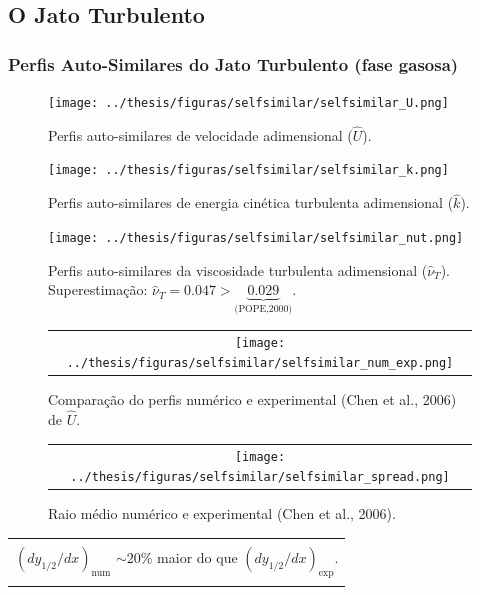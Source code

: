 \documentclass[bars,mathserif]{beamer}
\begin{document}
\subsection{O Jato Turbulento}
\frametitle{Perfis Auto-Similares do Jato Turbulento (fase gasosa)}
\begin{frame}
\begin{overprint}
\begin{figure}
\centering
\texttt{[image: ../thesis/figuras/selfsimilar/selfsimilar\_U.png]}
\caption{Perfis auto-similares de velocidade adimensional ($\hat{U}$).}
\end{figure}

\begin{figure}
\centering
\texttt{[image: ../thesis/figuras/selfsimilar/selfsimilar\_k.png]}
\caption{Perfis auto-similares de energia cinética turbulenta adimensional ($\hat{k}$).}
\end{figure}

\begin{figure}
\centering
\texttt{[image: ../thesis/figuras/selfsimilar/selfsimilar\_nut.png]}
\caption{Perfis auto-similares da viscosidade turbulenta adimensional ($\hat{\nu}_T$). Superestimação: $\hat{\nu}_T=0.047 > \underbrace{0.029}_{\text{(POPE,2000)}}$.}
\end{figure}
\end{overprint}
\end{frame}
%
\begin{frame}
 \begin{figure}[!htb]
 \centering
\begin{tabular}{c}
 \texttt{[image: ../thesis/figuras/selfsimilar/selfsimilar\_num\_exp.png]}
\end{tabular}
 \caption{Comparação do perfis numérico e experimental (Chen et al., 2006) de $\hat{U}$.}
\end{figure}
\end{frame}
%
\begin{frame}
 \begin{figure}[!htb]
 \centering
\begin{tabular}{c}
 \texttt{[image: ../thesis/figuras/selfsimilar/selfsimilar\_spread.png]}
\end{tabular}
 \caption{Raio médio numérico e experimental (Chen et al., 2006).}
\end{figure}

\footnotesize
\begin{tabular}{|l|}
\hline \\
$(d y_{1/2}/dx)_{\text{num}}$ $\sim 20\%$ maior do que $(d y_{1/2}/dx)_{\text{exp}}$.\\ \\
\hline 
\end{tabular}
\end{frame}
%
\end{document}
